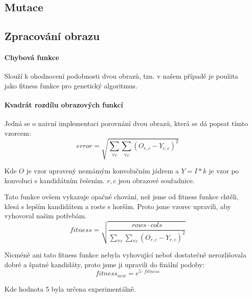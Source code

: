 \documentclass[a4paper,11pt]{scrartcl}
\begin{document}
\subsection{Mutace}

\subsection{Zpracování obrazu}

\paragraph{Chybová funkce}

Slouží k ohodnocení podobnosti dvou obrazů, tzn. v našem případě je použita jako fitness funkce pro genetický algoritmus.

\paragraph{Kvadrát rozdílu obrazových funkcí}

Jedná se o naivní implementaci porovnání dvou obrazů, která se dá popsat tímto vzorcem:
\begin{equation}
  error = \sqrt{\sum\limits_{\forall r} \sum\limits_{\forall c} ( O_{r,c} - Y_{r,c} )^2}
\end{equation}

Kde $O$ je vzor upravený neznámým konvolučním jádrem a $Y = I \ast k $ je vzor po konvoluci s kandidátním řešením. $r,c$ jsou obrazové souřadnice.

Tato funkce ovšem vykazuje opačné chování, než jsme od fitness funkce chtěli, klesá s lepším kandidátem a roste s horším. Proto jsme vzorec upravili, aby vyhovoval našim potřebám.
\begin{equation}
  fitness = \sqrt{\frac{rows \cdot cols}{{\sum\limits_{\forall r} \sum\limits_{\forall c} ( O_{r,c} - Y_{r,c} )^2}}}
\end{equation}

Nicméně ani tato fitness funkce nebyla vyhovující neboť dostatečně nerozlišovala dobré a špatné kandidáty, proto jsme ji upravili do finální podoby:
\begin{equation}
  fitness_{new} = e ^ {5 \cdot fitness}
\end{equation}

Kde hodnota 5 byla určena experimentálně.
\end{document}
